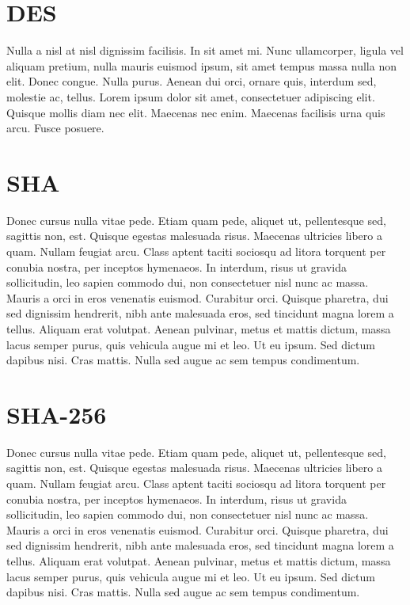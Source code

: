 \documentclass[printmode]{mgr}
\begin{document}
\chapter{DES}
Nulla a nisl at nisl dignissim facilisis. In sit amet mi. Nunc
ullamcorper, ligula vel aliquam pretium, nulla mauris euismod ipsum,
sit amet tempus massa nulla non elit. Donec congue. Nulla
purus. Aenean dui orci, ornare quis, interdum sed, molestie ac,
tellus. Lorem ipsum dolor sit amet, consectetuer adipiscing
elit. Quisque mollis diam nec elit. Maecenas nec enim. Maecenas
facilisis urna quis arcu. Fusce posuere.


\appendix
\chapter{SHA}
Donec cursus nulla vitae pede. Etiam quam pede, aliquet ut,
pellentesque sed, sagittis non, est. Quisque egestas malesuada
risus. Maecenas ultricies libero a quam. Nullam feugiat arcu. Class
aptent taciti sociosqu ad litora torquent per conubia nostra, per
inceptos hymenaeos. In interdum, risus ut gravida sollicitudin, leo
sapien commodo dui, non consectetuer nisl nunc ac massa. Mauris a orci
in eros venenatis euismod. Curabitur orci. Quisque pharetra, dui sed
dignissim hendrerit, nibh ante malesuada eros, sed tincidunt magna
lorem a tellus. Aliquam erat volutpat. Aenean pulvinar, metus et
mattis dictum, massa lacus semper purus, quis vehicula augue mi et
leo. Ut eu ipsum. Sed dictum dapibus nisi. Cras mattis. Nulla sed
augue ac sem tempus condimentum.

\chapter{SHA-256}
Donec cursus nulla vitae pede. Etiam quam pede, aliquet ut,
pellentesque sed, sagittis non, est. Quisque egestas malesuada
risus. Maecenas ultricies libero a quam. Nullam feugiat arcu. Class
aptent taciti sociosqu ad litora torquent per conubia nostra, per
inceptos hymenaeos. In interdum, risus ut gravida sollicitudin, leo
sapien commodo dui, non consectetuer nisl nunc ac massa. Mauris a orci
in eros venenatis euismod. Curabitur orci. Quisque pharetra, dui sed
dignissim hendrerit, nibh ante malesuada eros, sed tincidunt magna
lorem a tellus. Aliquam erat volutpat. Aenean pulvinar, metus et
mattis dictum, massa lacus semper purus, quis vehicula augue mi et
leo. Ut eu ipsum. Sed dictum dapibus nisi. Cras mattis. Nulla sed
augue ac sem tempus condimentum.




\end{document}
